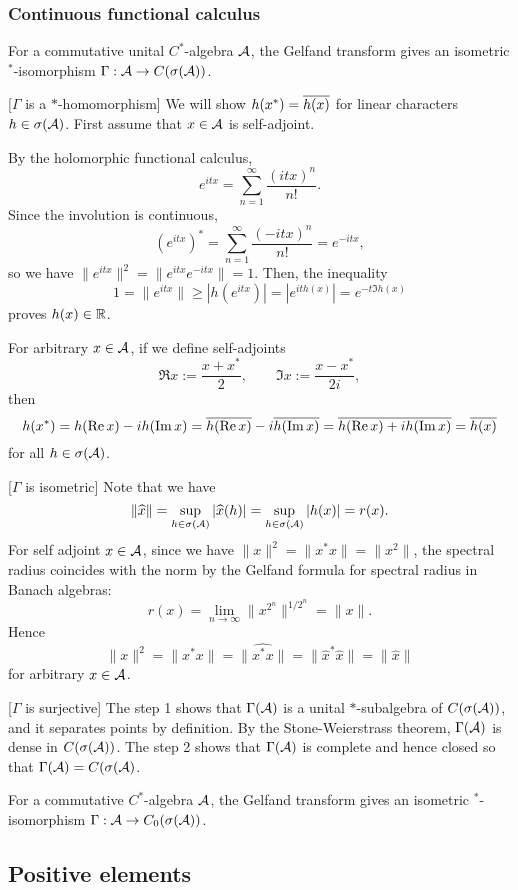 \documentclass{../note}
\begin{document}
\subsubsection{Continuous functional calculus}
\begin{thm}
For a commutative unital $C^*$-algebra $\cA$, the Gelfand transform gives an isometric $^*$-isomorphism $\Gamma:\cA\to C(\sigma(\cA))$.
\end{thm}
\begin{pf}
[$\Gamma$ is a $*$-homomorphism]
We will show $h(x^*)=\cl{h(x)}$ for linear characters $h\in\sigma(\cA)$.
First assume that $x\in\cA$ is self-adjoint.

By the holomorphic functional calculus,
\[e^{itx}=\sum_{n=1}^\infty\frac{(itx)^n}{n!}.\]
Since the involution is continuous,
\[(e^{itx})^*=\sum_{n=1}^\infty\frac{(-itx)^n}{n!}=e^{-itx},\]
so we have $\|e^{itx}\|^2=\|e^{itx}e^{-itx}\|=1$.
Then, the inequality
\[1=\|e^{itx}\|\ge|h(e^{itx})|=|e^{ith(x)}|=e^{-t\Im h(x)}\]
proves $h(x)\in\R$.

For arbitrary $x\in\cA$, if we define self-adjoints
\[\Re x:=\frac{x+x^*}2,\qquad\Im x:=\frac{x-x^*}{2i},\]
then
\[h(x^*)=h(\Re x)-ih(\Im x)=\cl{h(\Re x)}-i\cl{h(\Im x)}=\cl{h(\Re x)+ih(\Im x)}=\cl{h(x)}\]
for all $h\in\sigma(\cA)$.

[$\Gamma$ is isometric]
Note that we have
\[\|\hat x\|=\sup_{h\in\sigma(\cA)}|\hat x(h)|=\sup_{h\in\sigma(\cA)}|h(x)|=r(x).\]
For self adjoint $x\in\cA$, since we have $\|x\|^2=\|x^*x\|=\|x^2\|$, the spectral radius coincides with the norm by the Gelfand formula for spectral radius in Banach algebras:
\[r(x)=\lim_{n\to\infty}\|x^{2^n}\|^{1/2^n}=\|x\|.\]
Hence
\[\|x\|^2=\|x^*x\|=\|\hat{x^*x}\|=\|\hat{x}^*\hat{x}\|=\|\hat{x}\|\]
for arbitrary $x\in\cA$.

[$\Gamma$ is surjective]
The step 1 shows that $\Gamma(\cA)$ is a unital $*$-subalgebra of $C(\sigma(\cA))$, and it separates points by definition.
By the Stone-Weierstrass theorem, $\Gamma(\cA)$ is dense in $C(\sigma(\cA))$.
The step 2 shows that $\Gamma(\cA)$ is complete and hence closed so that $\Gamma(\cA)=C(\sigma(\cA)$.
\end{pf}
\begin{thm}
For a commutative $C^*$-algebra $\cA$, the Gelfand transform gives an isometric $^*$-isomorphism $\Gamma:\cA\to C_0(\sigma(\cA))$.
\end{thm}


\subsection{Positive elements}
\end{document}
